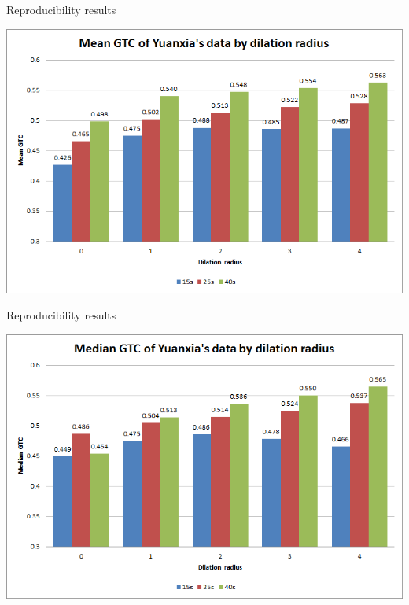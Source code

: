 \documentclass[14pt,xcolor=dvipsnames]{beamer}
\begin{document}
\begin{frame}[fragile,t]{Reproducibility results}
	\begin{center}
		\includegraphics[width=\paperheight]{yuanxia_mean_gtc}
	\end{center}
\end{frame}

\begin{frame}[fragile,t]{Reproducibility results}
	\begin{center}
		\includegraphics[width=\paperheight]{yuanxia_median_gtc}
	\end{center}
\end{frame}
\end{document}
